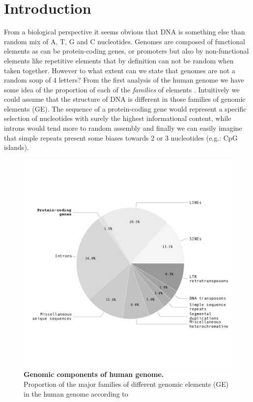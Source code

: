 

\section{Introduction}
\label{sec:dna_struct-intro}

From a biological perspective it seems obvious that DNA is something else than random mix of A, T, G and C nucleotides. Genomes are composed of functional elements as can be protein-coding genes, or promoters but also by non-functional elements like repetitive elements that by definition can not be random when taken together. However to what extent can we state that genomes are not a random soup of 4 letters? From the first analysis of the human genome \cite{Lander2001} we have some idea of the proportion of each of the \textit{families} of elements . Intuitively we could assume that the structure of DNA is different in those families of genomic elements (GE). The sequence of a protein-coding gene would represent a specific selection of nucleotides with surely the highest informational content, while introns would tend more to random assembly and finally we can easily imagine that simple repeats present some biases towards 2 or 3 nucleotides (e.g.: CpG islands).

\begin{figure}[htpb] 
\centering 
\includegraphics[trim=0cm 3cm 0cm 3cm, width=\textwidth]{tex_source/figures/dna_struct/prop_rep.pdf}
\caption[Genomic components of human genome]{{\bf Genomic components of human genome.}\\
Proportion of the major families of different genomic elements (GE) in the human genome according to \cite{Lander2001}}
\label{fig:prop_rep}
\end{figure}



